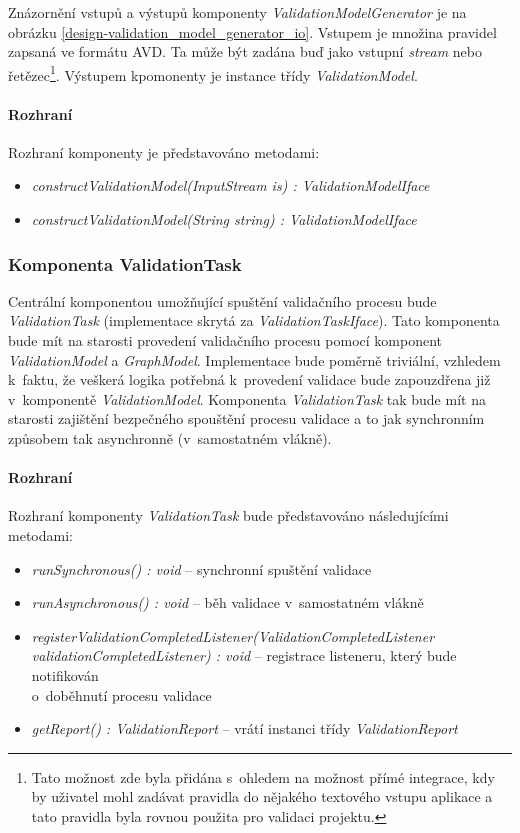 Znázornění vstupů a výstupů komponenty \emph{ValidationModelGenerator} je na obrázku \ref{design-validation_model_generator_io}. Vstupem je množina pravidel zapsaná ve formátu AVD. Ta může být zadána buď jako vstupní \emph{stream} nebo řetězec\footnote{Tato možnost zde byla přidána s~ohledem na možnost přímé integrace, kdy by uživatel mohl zadávat pravidla do nějakého textového vstupu aplikace a tato pravidla byla rovnou použita pro validaci projektu.}. Výstupem kpomonenty je instance třídy \emph{ValidationModel}.

\paragraph{Rozhraní} Rozhraní komponenty je představováno metodami:

\begin{itemize}
\item \emph{constructValidationModel(InputStream is) : ValidationModelIface}
\item \emph{constructValidationModel(String string) : ValidationModelIface}
\end{itemize}

\subsubsection{Komponenta ValidationTask}
\label{design-component_validation_task}
Centrální komponentou umožňující spuštění validačního procesu bude \emph{ValidationTask} (implementace skrytá za \emph{ValidationTaskIface}). Tato komponenta bude mít na starosti provedení validačního procesu pomocí komponent \emph{ValidationModel} a \emph{GraphModel}. Implementace bude poměrně triviální, vzhledem k~faktu, že veškerá logika potřebná k~provedení validace bude zapouzdřena již v~komponentě \emph{ValidationModel}. Komponenta \emph{ValidationTask} tak bude mít na starosti zajištění bezpečného spouštění procesu validace a to jak synchronním způsobem tak asynchronně (v~samostatném vlákně).

\paragraph{Rozhraní} Rozhraní komponenty \emph{ValidationTask} bude představováno následujícími metodami:
\begin{itemize}
\item \emph{runSynchronous() : void} -- synchronní spuštění validace
\item \emph{runAsynchronous() : void} -- běh validace v~samostatném vlákně
\item \emph{registerValidationCompletedListener(ValidationCompletedListener \\ validationCompletedListener) : void} -- registrace listeneru, který bude notifikován \\ o~doběhnutí procesu validace
\item \emph{getReport() : ValidationReport} -- vrátí instanci třídy \emph{ValidationReport}
\end{itemize}

